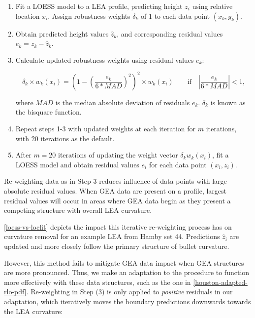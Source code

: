 \documentclass[12pt]{article}
\begin{document}
\begin{enumerate}

\item Fit a LOESS model to a LEA profile, predicting height $z_i$ using relative location $x_i$. Assign robustness weights $\delta_k$ of 1 to each data point $(x_k, y_k)$.  
\item Obtain predicted height values $\widehat{z}_k$, and corresponding residual values $e_k = z_k - \widehat{z}_k$. 
\item Calculate updated robustness weights using residual values $e_k$: 

$$\delta_k \times w_k(x_i) =\left(1 - \left(\frac{e_k}{6*MAD}\right)^2\right)^2 \times w_k(x_i) \quad \quad \mbox{if}\quad \left|\frac{e_k}{6*MAD} \right| < 1,$$

where $MAD$ is the median absolute deviation of residuals $e_k$. $\delta_k$ is known as the bisquare function.  
\item Repeat steps 1-3 with updated weights at each iteration for $m$ iterations, with 20 iterations as the default.  
\item After $m=20$ iterations of updating the weight vector $\delta_k w_k(x_i)$, fit a LOESS model and obtain residual values $e_i$ for each data point $(x_i, z_i)$. 
\end{enumerate}

{\color{purple}{How do we know when to stop? (How many iterations $m$?)}}

Re-weighting data as in Step 3 reduces influence of data points with
large absolute residual values. When GEA data are present on a profile,
largest residual values will occur in areas where GEA data begin as they
present a competing structure with overall LEA curvature.

\autoref{loess-vs-locfit} depicts the impact this iterative re-weighting
process has on curvature removal for an example LEA from Hamby set 44.
Predictions \(\widehat{z}_i\) are updated and more closely follow the
primary structure of bullet curvature.

However, this method fails to mitigate GEA data impact when GEA
structures are more pronounced. Thus, we make an adaptation to the
procedure to function more effectively with these data structures, such
as the one in \autoref{houston-adapted-rlo-pdf}. Re-weighting in Step
(3) is only applied to \textit{positive} residuals in our adaptation,
which iteratively moves the boundary predictions downwards towards the
LEA curvature:
\end{document}
